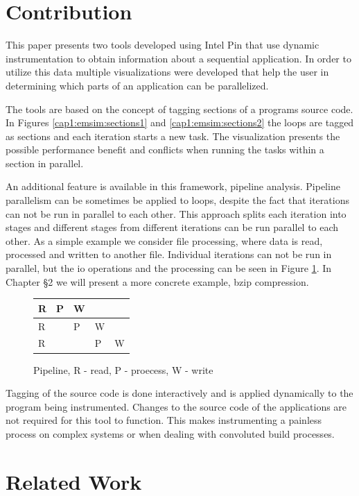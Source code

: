 \section {Contribution}

This paper presents two tools developed using Intel Pin that use dynamic instrumentation to obtain information about a sequential application. In order to utilize this data multiple visualizations were developed that help the user in determining which parts of an application can be parallelized.

The tools are based on the concept of tagging sections of a programs source code. In Figures \ref{cap1:emsim:sections1} and \ref{cap1:emsim:sections2} the loops are tagged as sections and each iteration starts a new task. The visualization presents the possible performance benefit and conflicts when running the tasks within a section in parallel.

An additional feature is available in this framework, pipeline analysis. Pipeline parallelism can be sometimes be applied to loops, despite the fact that iterations can not be run in parallel to each other. This approach splits each iteration into stages and different stages from different iterations can be run parallel to each other. As a simple example we consider file processing, where data is read, processed and written to another file. Individual iterations can not be run in parallel, but the io operations and the processing can be seen in Figure \ref{cap1:pipeline}. In Chapter §2 we will present a more concrete example, bzip compression.

\begin{figure}[!ht]
	\centering
	\begin{tabular}{ l | l | l | l | l}
		R & P & W & & \\
		\hline
		R &  & P & W & \\
		\hline
		R &  & & P & W \\
	\end{tabular}
	\caption{Pipeline, R - read, P - proecess, W - write}
	\label{cap1:pipeline}
\end{figure}

Tagging of the source code is done interactively and is applied dynamically to the program being instrumented. Changes to the source code of the applications are not required for this tool to function. This makes instrumenting a painless process on complex systems or when dealing with convoluted build processes.

\section {Related Work}

